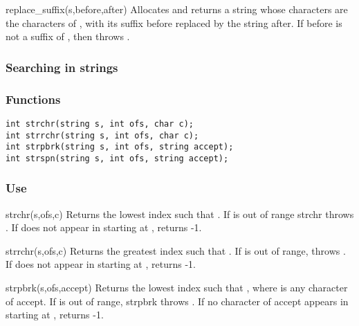 \begin{defun}{replace_suffix}{(s,before,after)}
Allocates and returns a string whose characters are the characters of
, with its suffix before replaced by the string after.  If before
is not a suffix of , then  throws
.
\end{defun}

\subsubsection*{Searching in strings}
\subsubsection*{Functions}
\begin{verbatim}
int strchr(string s, int ofs, char c);
int strrchr(string s, int ofs, char c);
int strpbrk(string s, int ofs, string accept);
int strspn(string s, int ofs, string accept);
\end{verbatim}

\subsubsection*{Use}

\begin{defun}{strchr}{(s,ofs,c)}
Returns the lowest index  such that
.  If  is out of range strchr
throws .  If  does not
appear in  starting at ,  returns -1.
\end{defun}

\begin{defun}{strrchr}{(s,ofs,c)}
Returns the greatest index  such that
.  If  is out of range,
 throws .  If
 does not appear in  starting at , 
returns -1.
\end{defun}

\begin{defun}{strpbrk}{(s,ofs,accept)}
Returns the lowest index  such that
, where  is any character of
accept.  If  is out of range, strpbrk throws
.  If no character of accept
appears in  starting at ,  returns -1.
\end{defun}

